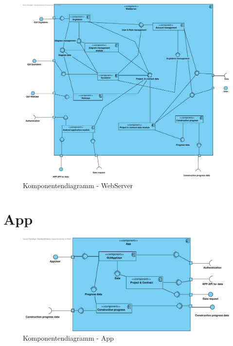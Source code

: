 \begin{figure}[H]
	\centering
	\includegraphics[width=16cm]{img/diagrams/Component-WebServer.pdf}	
	\caption{Komponentendiagramm - WebServer}
	\label{fig:komponentendiagramm-webserver}
\end{figure}

\section{App}

\begin{figure}[H]
	\centering
	\includegraphics[width=16cm]{img/diagrams/Component-App.pdf}	
	\caption{Komponentendiagramm - App}
	\label{fig:komponentendiagramm-app}
\end{figure}
